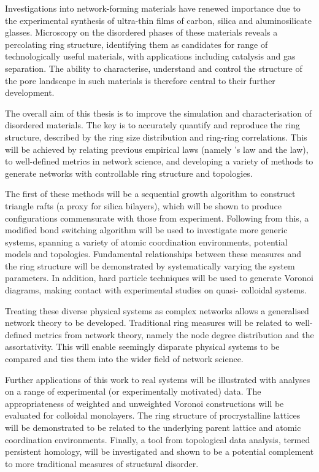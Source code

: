 Investigations into \td{} network\--forming materials have renewed importance due to the experimental synthesis of ultra\--thin films of carbon, silica and aluminosilicate glasses.
Microscopy on the disordered phases of these materials reveals a percolating ring structure, identifying them as candidates for range of technologically useful materials, with applications including catalysis and gas separation.
The ability to characterise, understand and control the structure of the pore landscape in such materials is therefore central to their further development.

The overall aim of this thesis is to improve the simulation and characterisation of \td{} disordered materials.
The key is to accurately quantify and reproduce the ring structure, described by the ring size distribution and ring\--ring correlations.
This will be achieved by relating previous empirical laws (namely \lm's law and the \aw{} law), to well\--defined metrics in network science, and developing a variety of \mc{} methods to generate networks with controllable ring structure and topologies.

The first of these methods will be a sequential growth algorithm to construct triangle rafts (a proxy for silica bilayers), which will be shown to produce configurations commensurate with those from experiment.
Following from this, a modified bond switching algorithm will be used to investigate more generic systems, spanning a variety of atomic coordination environments, potential models and topologies. 
Fundamental relationships between these measures and the ring structure will be demonstrated by systematically varying the system parameters.
In addition, hard particle \mc{} techniques will be used to generate Voronoi diagrams, making contact with experimental studies on quasi\--\td{} colloidal systems.

Treating these diverse physical systems as complex networks allows a generalised network theory to be developed.
Traditional ring measures will be related to well\--defined metrics from network theory, namely the node degree distribution and the assortativity.
This will enable seemingly disparate physical systems to be compared and ties them into the wider field of network science.

Further applications of this work to real systems will be illustrated with analyses on a range of experimental (or experimentally motivated) data.
The appropriateness of weighted and unweighted Voronoi constructions will be evaluated for colloidal monolayers.
The ring structure of procrystalline lattices will be demonstrated to be related to the underlying parent lattice and atomic coordination environments.
Finally, a tool from topological data analysis, termed persistent homology, will be investigated and shown to be a potential complement to more traditional measures of structural disorder.

